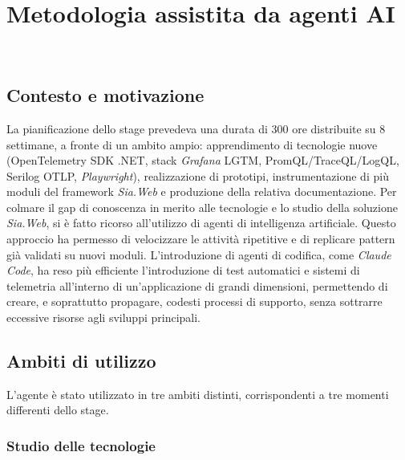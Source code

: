 \chapter{Metodologia assistita da agenti AI}
\label{cap:metodologia-ai}

\\

\section{Contesto e motivazione}

La pianificazione dello stage prevedeva una durata di 300 ore distribuite su 8 settimane,
a fronte di un ambito ampio: apprendimento di tecnologie nuove (OpenTelemetry SDK .NET,
stack \emph{Grafana} LGTM, PromQL/TraceQL/LogQL, Serilog OTLP, \emph{Playwright}), realizzazione
di prototipi, instrumentazione di più moduli del framework \emph{Sia.Web} e produzione della
relativa documentazione. Per colmare il gap di conoscenza in merito alle tecnologie e lo studio
della soluzione \emph{Sia.Web}, si è fatto ricorso all’utilizzo di agenti di intelligenza artificiale. 
Questo approccio ha permesso di velocizzare le attività ripetitive e di replicare pattern già validati su nuovi moduli.
L'introduzione di agenti di codifica, come \emph{Claude Code}, ha reso più efficiente l'introduzione 
di test automatici e sistemi di telemetria all’interno di un’applicazione di grandi dimensioni, 
permettendo di creare, e soprattutto propagare, codesti processi di supporto, senza sottrarre eccessive risorse agli sviluppi principali. 

\section{Ambiti di utilizzo}

L'agente è stato utilizzato in tre ambiti distinti, corrispondenti a tre momenti differenti
dello stage.

\subsection{Studio delle tecnologie}


